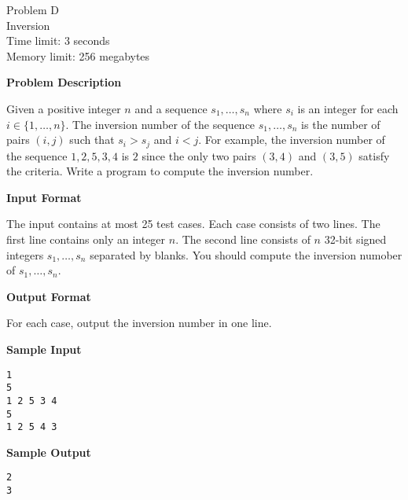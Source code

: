 \documentclass[11pt]{article}
\begin{document}
\begin{center}
    {\LARGE Problem D}\\
    {\Large Inversion}\\
    {Time limit: 3 seconds}\\
    {Memory limit: 256 megabytes}
\end{center}

\textbf{\large Problem Description}

Given a positive integer $n$ and a sequence $s_1,\dots,s_n$ where $s_i$ is an
integer for each $i\in\{1,\dots,n\}$.
The inversion number of the sequence $s_1,\dots,s_n$ is the number of pairs
$(i,j)$ such that $s_i>s_j$ and $i<j$. For example, the inversion number of
the sequence $1,2,5,3,4$ is $2$ since the only two pairs $(3,4)$ and $(3,5)$
satisfy the criteria. Write a program to compute the inversion number.

\textbf{\large Input Format}

The input contains at most 25 test cases. 
Each case consists of two lines. The first line contains only an integer $n$. 
The second line consists of $n$ 32-bit signed integers 
$s_1,\dots,s_n$ separated by blanks.
You should compute the inversion numober of $s_1,\dots,s_n$.

\textbf{\large Output Format}

For each case, output the inversion number in one line.

\textbf{\large Sample Input}

\begin{verbatim}
1
5
1 2 5 3 4
5
1 2 5 4 3
\end{verbatim}

\textbf{\large Sample Output}
\begin{verbatim}
2
3
\end{verbatim}
\end{document}

